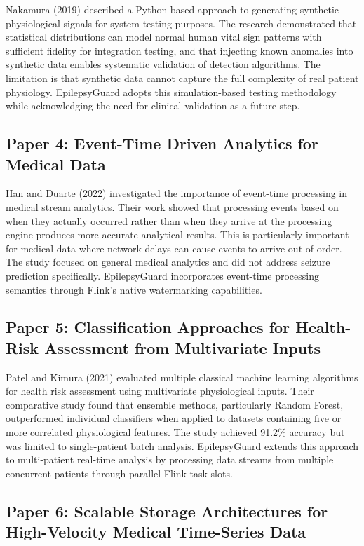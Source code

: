 \documentclass[12pt, a4paper, oneside]{report}
\begin{document}
Nakamura (2019) described a Python-based approach to generating synthetic physiological signals for system testing purposes. The research demonstrated that statistical distributions can model normal human vital sign patterns with sufficient fidelity for integration testing, and that injecting known anomalies into synthetic data enables systematic validation of detection algorithms. The limitation is that synthetic data cannot capture the full complexity of real patient physiology. EpilepsyGuard adopts this simulation-based testing methodology while acknowledging the need for clinical validation as a future step.

\subsection{Paper 4: Event-Time Driven Analytics for Medical Data}

Han and Duarte (2022) investigated the importance of event-time processing in medical stream analytics. Their work showed that processing events based on when they actually occurred rather than when they arrive at the processing engine produces more accurate analytical results. This is particularly important for medical data where network delays can cause events to arrive out of order. The study focused on general medical analytics and did not address seizure prediction specifically. EpilepsyGuard incorporates event-time processing semantics through Flink's native watermarking capabilities.

\subsection{Paper 5: Classification Approaches for Health-Risk Assessment from Multivariate Inputs}

Patel and Kimura (2021) evaluated multiple classical machine learning algorithms for health risk assessment using multivariate physiological inputs. Their comparative study found that ensemble methods, particularly Random Forest, outperformed individual classifiers when applied to datasets containing five or more correlated physiological features. The study achieved 91.2\% accuracy but was limited to single-patient batch analysis. EpilepsyGuard extends this approach to multi-patient real-time analysis by processing data streams from multiple concurrent patients through parallel Flink task slots.

\subsection{Paper 6: Scalable Storage Architectures for High-Velocity Medical Time-Series Data}
\end{document}
